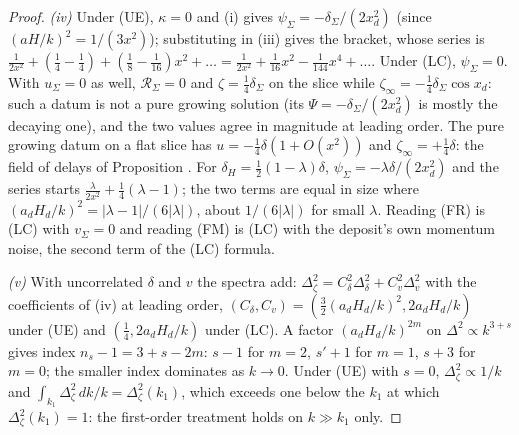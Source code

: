 \begin{proof}
\emph{(iv)} Under (UE), $\kappa = 0$ and (i) gives $\psi_{\Sigma} = -\delta_{\Sigma}/(2x_{d}^{2})$ (since $(aH/k)^{2} = 1/(3x^{2})$); substituting in (iii) gives the bracket, whose series is $\tfrac{1}{2x^{2}} + (\tfrac14 - \tfrac14) + (\tfrac18 - \tfrac1{16})x^{2} + \dots = \tfrac{1}{2x^{2}} + \tfrac{1}{16}x^{2} - \tfrac{1}{144}x^{4} + \dots$. Under (LC), $\psi_{\Sigma} = 0$. With $u_{\Sigma} = 0$ as well, $\mathcal{R}_{\Sigma} = 0$ and $\zeta = \tfrac14\delta_{\Sigma}$ on the slice while $\zeta_{\infty} = -\tfrac14\delta_{\Sigma}\cos x_{d}$: such a datum is not a pure growing solution (its $\Psi = -\delta_{\Sigma}/(2x_{d}^{2})$ is mostly the decaying one), and the two values agree in magnitude at leading order. The pure growing datum on a flat slice has $u = -\tfrac14\delta(1 + O(x^{2}))$ and $\zeta_{\infty} = +\tfrac14\delta$: the field of delays of Proposition . For $\delta_{H} = \tfrac12(1 - \lambda)\delta$, $\psi_{\Sigma} = -\lambda\delta/(2x_{d}^{2})$ and the series starts $\tfrac{\lambda}{2x^{2}} + \tfrac14(\lambda - 1)$; the two terms are equal in size where $(a_{d}H_{d}/k)^{2} = |\lambda - 1|/(6|\lambda|)$, about $1/(6|\lambda|)$ for small $\lambda$. Reading (FR) is (LC) with $v_{\Sigma} = 0$ and reading (FM) is (LC) with the deposit's own momentum noise, the second term of the (LC) formula.

\emph{(v)} With uncorrelated $\delta$ and $v$ the spectra add: $\Delta^{2}_{\zeta} = C_{\delta}^{2}\Delta^{2}_{\delta} + C_{v}^{2}\Delta^{2}_{v}$ with the coefficients of (iv) at leading order, $(C_{\delta}, C_{v}) = (\tfrac32(a_{d}H_{d}/k)^{2}, 2a_{d}H_{d}/k)$ under (UE) and $(\tfrac14, 2a_{d}H_{d}/k)$ under (LC). A factor $(a_{d}H_{d}/k)^{2m}$ on $\Delta^{2} \propto k^{3 + s}$ gives index $n_{s} - 1 = 3 + s - 2m$: $s - 1$ for $m = 2$, $s' + 1$ for $m = 1$, $s + 3$ for $m = 0$; the smaller index dominates as $k \to 0$. Under (UE) with $s = 0$, $\Delta^{2}_{\zeta} \propto 1/k$ and $\int_{k_{1}}\Delta^{2}_{\zeta}\,dk/k = \Delta^{2}_{\zeta}(k_{1})$, which exceeds one below the $k_{1}$ at which $\Delta^{2}_{\zeta}(k_{1}) = 1$: the first-order treatment holds on $k \gg k_{1}$ only.


\end{proof}
